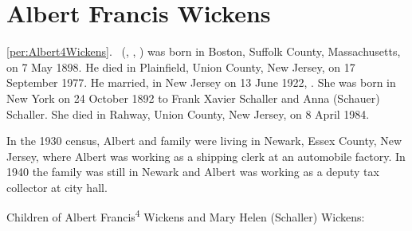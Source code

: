 \section{Albert Francis Wickens}
\ref{per:Albert4Wickens}.\  (, , ) was born in Boston, Suffolk County, Massachusetts, on 7 May 1898.\cite{Albert4WickensBirth} He died in Plainfield, Union County, New Jersey, on 17 September 1977.\cite{Albert4WickensDeath,Albert4WickensDeath2} He married, in New Jersey on 13 June 1922, .\cite{Albert4WickensMarriage} She was born in New York on 24 October 1892\cite{MarySchallerDeath,Census1900MarySchaller} to Frank Xavier Schaller and Anna (Schauer) Schaller.\cite{Census1900MarySchaller,MarySchallerParents} She died in Rahway, Union County, New Jersey, on 8 April 1984.\cite{MarySchallerDeath,MarySchallerDeath2}

In the 1930 census, Albert and family were living in Newark, Essex County, New Jersey, where Albert was working as a shipping clerk at an automobile factory.\cite{Census1930AlbertWickens} In 1940 the family was still in Newark and Albert was working as a deputy tax collector at city hall.\cite{Census1940AlbertWickens}

\begin{KidsIntro}
	Children of Albert Francis\textsuperscript{4} Wickens and Mary Helen (Schaller) Wickens:
\end{KidsIntro}

\begin{Kids}
	
	
	
	
	
	
	
\end{Kids}

